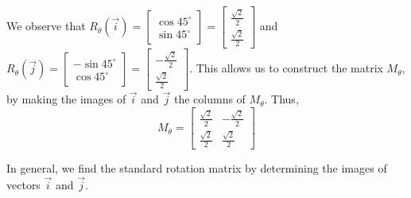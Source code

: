 \documentclass{ximera}
\begin{document}
\begin{example}
\begin{explanation}
\begin{center}
\begin{tikzpicture}[scale=2.2]
 \end{tikzpicture}
\end{center}



We observe that $R_{\theta}(\vec{i})=\begin{bmatrix}
\cos 45^{\circ} \\
\sin 45^{\circ}
\end{bmatrix}=\begin{bmatrix}
\frac{\sqrt{2}}{2} \\
\frac{\sqrt{2}}{2}
\end{bmatrix}$ and $R_{\theta}(\vec{j})=\begin{bmatrix}
-\sin 45^{\circ} \\
\cos 45^{\circ}
\end{bmatrix}=\begin{bmatrix}
-\frac{\sqrt{2}}{2} \\
\frac{\sqrt{2}}{2}
\end{bmatrix}$.  This allows us to construct the matrix $M_{\theta}$, by making the images of $\vec{i}$ and $\vec{j}$ the columns of $M_{\theta}$.  Thus, 
$$M_{\theta}=\begin{bmatrix}
\frac{\sqrt{2}}{2} & -\frac{\sqrt{2}}{2}\\
\frac{\sqrt{2}}{2} & \frac{\sqrt{2}}{2}
\end{bmatrix}$$
\end{explanation}
\end{example}

In general, we find the standard rotation matrix by determining the images of vectors $\vec{i}$ and $\vec{j}$.
\end{document}
